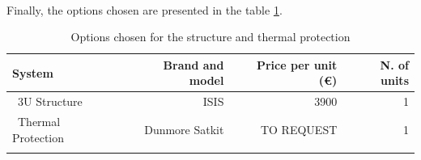 \paragraph{}Finally, the options chosen are presented in the table \ref{structurefinal}.

\begin{longtable}{| l | r | r | r | }
\hline
\rowcolor[gray]{0.80}	\textbf{System} &  \textbf{Brand and model}     & \textbf{Price per unit (\euro)} & \textbf{N. of units}  \\
\hline
\endfirsthead

	   ~3U Structure & ISIS & 3900 & 1 \\
	   \hline
	   ~Thermal Protection & Dunmore Satkit & TO REQUEST & 1\\
	\hline

\caption{Options chosen for the structure and thermal protection}
\label{structurefinal}
\end{longtable}
